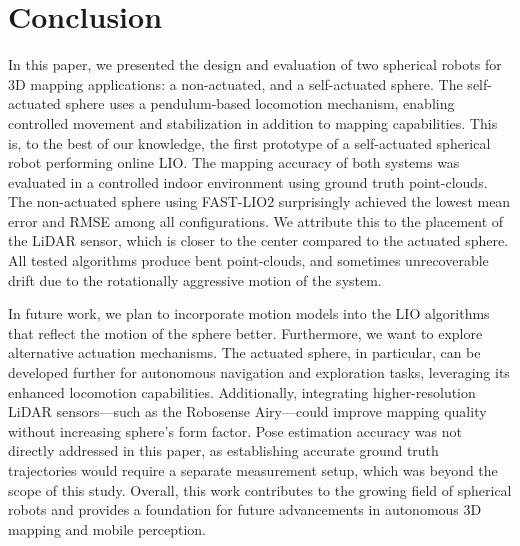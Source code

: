 \documentclass[english, bachelor, utf8]{base/thesis_telematics}
\begin{document}
\chapter{Conclusion}
In this paper, we presented the design and evaluation of two spherical robots for 3D mapping applications: a non-actuated, and a self-actuated sphere. 
The self-actuated sphere uses a pendulum-based locomotion mechanism, enabling controlled movement and stabilization in addition to mapping capabilities.
This is, to the best of our knowledge, the first prototype of a self-actuated spherical robot performing online LIO.   
The mapping accuracy of both systems was evaluated in a controlled indoor environment using ground truth point-clouds. 
The non-actuated sphere using FAST-LIO2 surprisingly achieved the lowest mean error and RMSE among all configurations.
We attribute this to the placement of the LiDAR sensor, which is closer to the center compared to the actuated sphere.
All tested algorithms produce bent point-clouds, and sometimes unrecoverable drift due to the rotationally aggressive motion of the system.  

In future work, we plan to incorporate motion models into the LIO algorithms that reflect the motion of the sphere better.
Furthermore, we want to explore alternative actuation mechanisms.
The actuated sphere, in particular, can be developed further for autonomous navigation and exploration tasks, leveraging its enhanced locomotion capabilities. 
Additionally, integrating higher-resolution LiDAR sensors—such as the Robosense Airy—could improve mapping quality without increasing sphere's form factor. 
Pose estimation accuracy was not directly addressed in this paper, as establishing accurate ground truth trajectories would require a separate measurement setup, which was beyond the scope of this study.
Overall, this work contributes to the growing field of spherical robots and provides a foundation for future advancements in autonomous 3D mapping and mobile perception.
\end{document}

